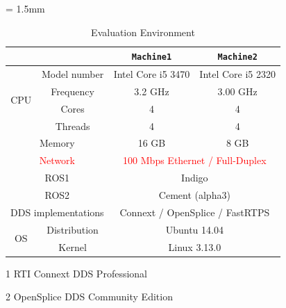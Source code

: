 \documentclass{sig-alternate-05-2015}
\begin{document}
\begin{table}[t]
  \caption{Evaluation Environment} 
  \vspace{-3mm}
  \centering
  \begin{threeparttable}
    \renewcommand{\arraystretch}{1.0}
    \label{tb:environment}
    \small
    \tabcolsep = 1.5mm              %
    \begin{tabular}{c|c||c|c}
      \hline
      \multicolumn{2}{c||}{ } & \textbf{\texttt{Machine1}} & \textbf{\texttt{Machine2}} \\ \hline \hline
      \multirow{4}{*}{CPU}   & Model number & Intel Core i5 3470 & Intel Core i5 2320 \\ 
      & Frequency & 3.2 GHz & 3.00 GHz \\ 
      & Cores & 4 & 4 \\ 
      & Threads & 4 & 4 \\ \hline
      \multicolumn{2}{c||}{Memory} & 16 GB & 8 GB \\ \hline 
      \multicolumn{2}{c||}{\textcolor{red}{Network}} & \multicolumn{2}{c}{\textcolor{red}{100 Mbps Ethernet / Full-Duplex}} \\ \hline
      \multicolumn{2}{c||}{ROS1} & \multicolumn{2}{c}{Indigo} \\ 
      \multicolumn{2}{c||}{ROS2} & \multicolumn{2}{c}{Cement (alpha3)} \\ 
      \multicolumn{2}{c||}{DDS implementations} & \multicolumn{2}{c}{Connext\tnote{1} / OpenSplice\tnote{2} / FastRTPS } \\ \hline 
      \multirow{2}{*}{OS} & Distribution & \multicolumn{2}{c}{Ubuntu 14.04} \\ 
      & Kernel & \multicolumn{2}{c}{Linux 3.13.0} \\ \hline
    \end{tabular}
    \begin{tablenotes}
    \item[1] RTI Connext DDS Professional \cite{rti_connext}
    \item[2] OpenSplice DDS Community Edition \cite{ospl_dds_community}
    \end{tablenotes}
  \end{threeparttable}
  \vspace{-5mm}
\end{table}
\end{document}
